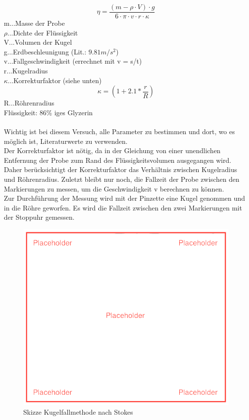 \documentclass[12pt,a4paper]{article}
\begin{document}
\begin{multicols}{2}
$$\eta = \frac{(m-\rho \cdot V) \cdot g}{6 \cdot \pi \cdot v \cdot r \cdot \kappa}$$
m...Masse der Probe\\
$\rho$...Dichte der Flüssigkeit\\
V...Volumen der Kugel\\
g...Erdbeschleunigung (Lit.: $9.81m/s^2$)\\
v...Fallgeschwindigkeit (errechnet mit v = s/t)\\
r...Kugelradius\\
$\kappa$...Korrekturfaktor (siehe unten)\\
$$\kappa =  (1+2.1 * \frac{r}{R})$$
R...Röhrenradius\\
Flüssigkeit: 86\% iges Glyzerin\\
\\
Wichtig ist bei diesem Versuch, alle Parameter zu bestimmen und dort, wo es möglich ist, Literaturwerte zu verwenden. \\
Der Korrekturfaktor ist nötig, da in der Gleichung von einer unendlichen Entfernung der Probe zum Rand des Flüssigkeitsvolumen ausgegangen wird. \\
Daher berücksichtigt der Korrekturfaktor das Verhältnis zwischen Kugelradius und Röhrenradius. Zuletzt bleibt nur noch, die Fallzeit der Probe zwischen den Markierungen zu messen, um die Geschwindigkeit v berechnen zu können.\\
Zur Durchführung der Messung wird mit der Pinzette eine Kugel genommen und in die Röhre geworfen. Es wird die Fallzeit zwischen den zwei Markierungen mit der Stoppuhr gemessen.
\begin{figure}[H]
	\centering
	\includegraphics[scale=0.4]{./figure/placeholder.png}
	\caption{Skizze Kugelfallmethode nach Stokes}
	\label{fig:visko_aufbau}
\end{figure}


\end{multicols}
\end{document}
